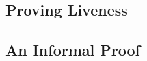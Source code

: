 \documentclass[fleqn,leqno]{article}
\begin{document}
% 
% 
% 
% 
%

\subsection{Proving Liveness}

\subsection{An Informal Proof}
\end{document}
